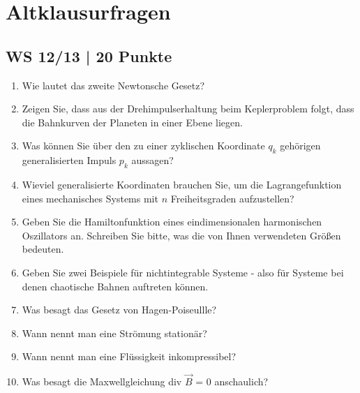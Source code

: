 \section{Altklausurfragen}
\subsection{WS 12/13 | 20 Punkte}
\begin{enumerate}
    \item Wie lautet das zweite Newtonsche Gesetz?
    \item Zeigen Sie, dass aus der Drehimpulserhaltung beim Keplerproblem folgt, dass die Bahnkurven der Planeten in einer Ebene liegen.
    \item Was können Sie über den zu einer zyklischen Koordinate $q_k$ gehörigen generalisierten Impuls $p_k$ aussagen?
    \item Wieviel generalisierte Koordinaten brauchen Sie, um die Lagrangefunktion eines mechanisches Systems mit $n$ Freiheitsgraden aufzustellen?
    \item Geben Sie die Hamiltonfunktion eines eindimensionalen harmonischen Oszillators an. Schreiben Sie bitte, was die von Ihnen verwendeten Größen bedeuten.
    \item Geben Sie zwei Beispiele für nichtintegrable Systeme - also für Systeme bei denen chaotische Bahnen auftreten können.
    \item Was besagt das Gesetz von Hagen-Poiseullle?
    \item Wann nennt man eine Strömung stationär?
    \item Wann nennt man eine Flüssigkeit inkompressibel?
    \item Was besagt die Maxwellgleichung div $\vec{B}$ = 0 anschaulich?
    
\end{enumerate}
